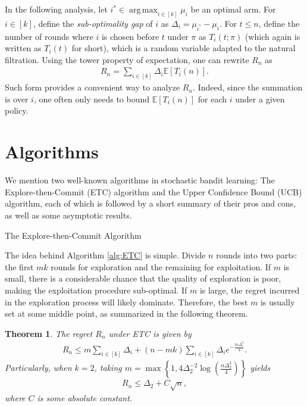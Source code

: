 \documentclass[letterpaper,11pt,openright,openany]{book}
\numberwithin{equation}{section}
\theoremstyle{plain}
\newtheorem{Th}{Theorem}[section]
\theoremstyle{definition}
\def\E{{\mathbb E}}
\DeclareMathOperator*{\argmax}{arg\,max}
\begin{document}
In the following analysis, let $i^*\in\argmax_{i\in [k]}\mu_i$ be an optimal arm. For $i\in [k]$, define the \emph{sub-optimality gap} of $i$ as $\Delta_i=\mu_{i^*}-\mu_i$. For $t\leq n$, define the number of rounds where $i$ is chosen before $t$ under $\pi$ as $T_i(t; \pi)$ (which again is written as $T_i(t)$ for short), which is a random variable adapted to the natural filtration. Using the tower property of expectation, one can rewrite $R_n$ as 
\begin{align}
R_n=\sum_{i\in [k]}\Delta_i\E[T_i(n)].\label{s:2}
\end{align} 
Such form provides a convenient way to analyze $R_n$.  Indeed, since the summation is over $i$, one often only needs to bound $\E[T_i(n)]$ for each $i$ under a given policy.  

\section{Algorithms}

We mention two well-known algorithms in stochastic bandit learning: The Explore-then-Commit (ETC) algorithm and the Upper Confidence Bound (UCB) algorithm, each of which is followed by a short summary of their pros and cons, as well as some asymptotic results.   

\begin{algorithm}
 \caption{The Explore-then-Commit Algorithm} 
 \begin{algorithmic}[1]
 \ELSE
 \STATE{$\pi_t = \argmax_{i\in [k]}\hat{\mu}_{i}(mk)$, where $\hat{\mu}_{i}(mk)=\frac{1}{m}\sum_{t=mi+1}^{m(i+1)}x_{t\pi_t}$}
 \ENDIF
 \ENDFOR
\end{algorithmic}
\label{alg:ETC}
\end{algorithm}


The idea behind Algorithm \ref{alg:ETC} is simple. Divide $n$ rounds into two parts: the first $mk$ rounds for exploration and the remaining for exploitation. 
If $m$ is small, there is a considerable chance that the quality of exploration is poor, making the exploitation procedure sub-optimal.  If $m$ is large, the regret incurred in the exploration process will likely dominate. Therefore, the best $m$ is usually set at some middle point, as summarized in the following theorem. 

\begin{Th}\label{thm:ETC}
The regret $R_n$ under ETC is given by
\begin{align}
R_n\leq m\sum_{i\in [k]}\Delta_i + (n-mk)\sum_{i\in [k]}\Delta_i e^{-\frac{m\Delta_i^2}{4}}.
\end{align}
Particularly, when $k=2$, taking $m=\max\left\{1, 4\Delta_2^{-2}\log\left(\frac{n\Delta_2^2}{4}\right)\right\}$ yields
\begin{align}
R_n\leq\Delta_2+C\sqrt{n},\label{ETC:opt}
\end{align}
where $C$ is some absolute constant. 
\end{Th}
\end{document}
